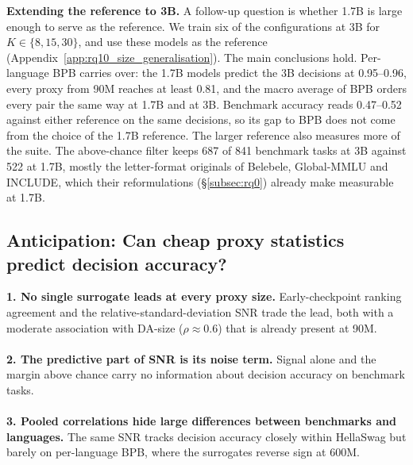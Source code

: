 \textbf{Extending the reference to 3B.}
A follow-up question is whether 1.7B is large enough to serve as the reference. We train six of the configurations at 3B for $K \in \{8, 15, 30\}$, and use these models as the reference (Appendix~\ref{app:rq10_size_generalisation}). The main conclusions hold. Per-language BPB carries over: the 1.7B models predict the 3B decisions at 0.95--0.96, every proxy from 90M reaches at least 0.81, and the macro average of BPB orders every pair the same way at 1.7B and at 3B. Benchmark accuracy reads 0.47--0.52 against either reference on the same decisions, so its gap to BPB does not come from the choice of the 1.7B reference. The larger reference also measures more of the suite. The above-chance filter keeps 687 of 841 benchmark tasks at 3B against 522 at 1.7B, mostly the letter-format originals of Belebele, Global-MMLU and INCLUDE, which their reformulations (\S\ref{subsec:rq0}) already make measurable at 1.7B.


\subsection{Anticipation: Can cheap proxy statistics predict decision accuracy?}
\label{subsec:rq3}

\begin{rqfinding}
\textbf{1. No single surrogate leads at every proxy size.} Early-checkpoint ranking agreement and the relative-standard-deviation SNR trade the lead, both with a moderate association with DA-size ($\rho \approx 0.6$) that is already present at 90M.
\\
\\
\textbf{2. The predictive part of SNR is its noise term.} Signal alone and the margin above chance carry no information about decision accuracy on benchmark tasks.
\\
\\
\textbf{3. Pooled correlations hide large differences between benchmarks and languages.} The same SNR tracks decision accuracy closely within HellaSwag but barely on per-language BPB, where the surrogates reverse sign at 600M.
\end{rqfinding}


